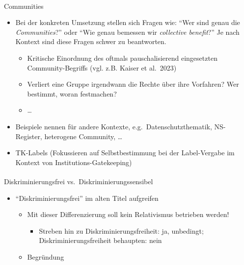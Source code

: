 \documentclass[
  letterpaper,
  DIV=11,
  numbers=noendperiod]{scrartcl}
\makeatletter
\let\oldparagraph\paragraph
\renewcommand{\paragraph}{
    \@ifstar
      \xxxParagraphStar
      \xxxParagraphNoStar
  }
\newcommand{\xxxParagraphStar}[1]{\oldparagraph*{#1}\mbox{}}
\newcommand{\xxxParagraphNoStar}[1]{\oldparagraph{#1}\mbox{}}
\providecommand{\tightlist}{%
  \setlength{\itemsep}{0pt}\setlength{\parskip}{0pt}}\usepackage{longtable,booktabs,array}
\makeatother
\begin{document}
\begin{itemize}
  \paragraph{Communities}\label{communities}

  \begin{itemize}
  \tightlist
  \item
    Bei der konkreten Umsetzung stellen sich Fragen wie: ``Wer sind
    genau die \emph{Communities}?'' oder ``Wie genau bemessen wir
    \emph{collective benefit}?'' Je nach Kontext sind diese Fragen
    schwer zu beantworten.

    \begin{itemize}
    \tightlist
    \item
      Kritische Einordnung des oftmals pauschalisierend eingesetzten
      Community-Begriffs (vgl. z.B. Kaiser et al.~2023)
    \item
      Verliert eine Gruppe irgendwann die Rechte über ihre Vorfahren?
      Wer bestimmt, woran festmachen?
    \item
      \ldots{}
    \end{itemize}
  \item
    Beispiele nennen für andere Kontexte, e.g.~Datenschutzthematik,
    NS-Register, heterogene Community, \ldots{}
  \item
    TK-Labels (Fokussieren auf Selbstbestimmung bei der Label-Vergabe im
    Kontext von Institutions-Gatekeeping)
  \end{itemize}

  \paragraph{Diskriminierungsfrei
  vs.~Diskriminierungssensibel}\label{diskriminierungsfrei-vs.-diskriminierungssensibel}

  \begin{itemize}
  \tightlist
  \item
    ``Diskriminierungsfrei'' im alten Titel aufgreifen

    \begin{itemize}
    \tightlist
    \item
      Mit dieser Differenzierung soll kein Relativismus betrieben
      werden!

      \begin{itemize}
      \tightlist
      \item
        Streben hin zu Diskriminierungsfreiheit: ja, unbedingt;
        Diskriminierungsfreiheit behaupten: nein
      \end{itemize}
    \item
      Begründung


\end{itemize}
\end{itemize}
\end{itemize}
\end{document}
